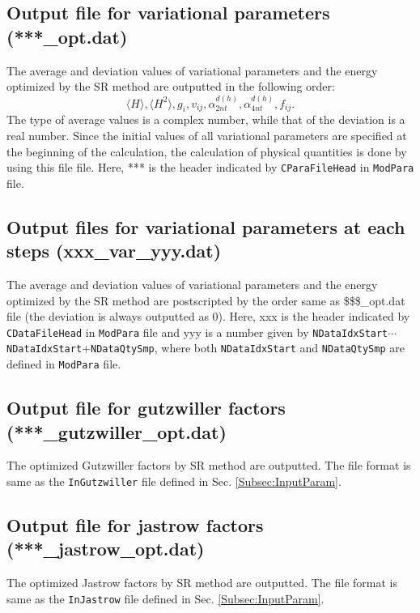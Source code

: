 \subsection{Output file for variational parameters (***\_opt.dat)}
The average and deviation values of variational parameters and the energy optimized by the SR method are outputted in the following order: 
\begin{equation}
\langle H \rangle, \langle H^2 \rangle, g_i, v_{ij}, \alpha_{2nt}^{d(h)}, \alpha_{4nt}^{d(h)}, f_{ij} \nonumber.
\end{equation}
The type of average values is a complex number, while that of the deviation is a real number.
Since the initial values of all variational parameters are specified at the beginning of the calculation, 
the calculation of physical quantities is done by using this file file.
Here, *** is the header indicated by \verb|CParaFileHead| in \verb|ModPara| file.

\subsection{Output files for variational parameters at each steps (xxx\_var\_yyy.dat)}
The average and deviation values of variational parameters and the energy optimized by the SR method are postscripted by the order same as \$\$\$\_opt.dat file (the deviation is always outputted as 0). 
Here, xxx is the header indicated by \verb|CDataFileHead| in \verb|ModPara| file and yyy is a number given by \verb|NDataIdxStart|$\cdots$\verb|NDataIdxStart|+\verb|NDataQtySmp|, where both \verb|NDataIdxStart| and \verb|NDataQtySmp| are defined in \verb|ModPara| file.

\subsection{Output file for gutzwiller factors \\(***\_gutzwiller\_opt.dat)}
The optimized Gutzwiller factors by SR method are outputted. The file format is same as the \verb|InGutzwiller| file defined in Sec. \ref{Subsec:InputParam}.

\subsection{Output file for jastrow factors \\(***\_jastrow\_opt.dat)}
The optimized Jastrow factors  by SR method are outputted. The file format is same as the \verb|InJastrow| file defined in Sec. \ref{Subsec:InputParam}.

